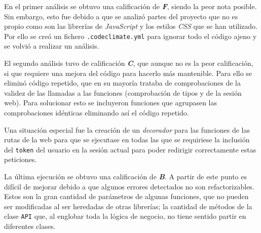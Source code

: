 En el primer análisis se obtuvo una calificación de \textbf{\textit{F}}, siendo la peor nota posible. Sin embargo, esto fue debido a que se analizó partes del proyecto que no es propio como son las librerías de \textit{JavaScript} y los estilos \textit{CSS} que se han utilizado. Por ello se creó un fichero \texttt{.codeclimate.yml} para ignorar todo el código ajeno y se volvió a realizar un análisis.

El segundo análisis tuvo de calificación \textit{\textbf{C}}, que aunque no es la peor calificación, si que requiere una mejora del código para hacerlo más mantenible. Para ello se eliminó código repetido, que en su mayoría trataba de comprobaciones de la validez de las llamadas a las funciones (comprobación de tipos y de la sesión web). Para solucionar esto se incluyeron funciones que agrupasen las comprobaciones idénticas eliminando así el código repetido.

Una situación especial fue la creación de un \textit{decorador} para las funciones de las rutas de la web para que se ejecutase en todas las que se requiriese la inclusión del \texttt{token} del usuario en la sesión actual para poder redirigir correctamente estas peticiones. 

La última ejecución se obtuvo una calificación de \textit{\textbf{B}}. A partir de este punto es difícil de mejorar debido a que algunos errores detectados no son refactorizables. Estos son la gran cantidad de parámetros de algunas funciones, que no pueden ser modificadas al ser heredadas de otras librerías; la cantidad de métodos de la clase \texttt{API} que, al englobar toda la lógica de negocio, no tiene sentido partir en diferentes clases. 

